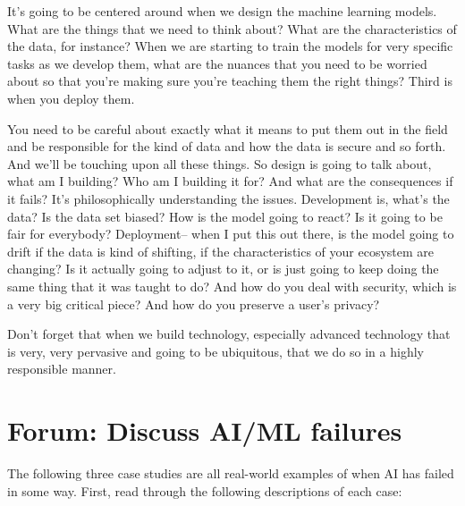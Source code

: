It's going to be centered around when we design the machine learning models.
What are the things that we need to think about?
What are the characteristics of the data, for instance?
When we are starting to train the models for very specific tasks as we develop them, what are the nuances that you need to be worried about so that you're making sure you're teaching them the right things?
Third is when you deploy them.

You need to be careful about exactly what it means to put them out
in the field and be responsible for the kind of data and how the data is secure
and so forth.
And we'll be touching upon all these things.
So design is going to talk about, what am I building?
Who am I building it for?
And what are the consequences if it fails?
It's philosophically understanding the issues.
Development is, what's the data?
Is the data set biased?
How is the model going to react?
Is it going to be fair for everybody?
Deployment-- when I put this out there, is the model
going to drift if the data is kind of shifting,
if the characteristics of your ecosystem are changing?
Is it actually going to adjust to it, or is just
going to keep doing the same thing that it was taught to do?
And how do you deal with security, which is a very big critical piece?
And how do you preserve a user's privacy?




Don't forget that when we build technology, especially advanced technology that is very, very pervasive and going to be ubiquitous, that we do so in a highly responsible manner.



\section{Forum: Discuss AI/ML failures}



The following three case studies are all real-world examples of when AI has failed in some way. First, read through the following descriptions of each case:

